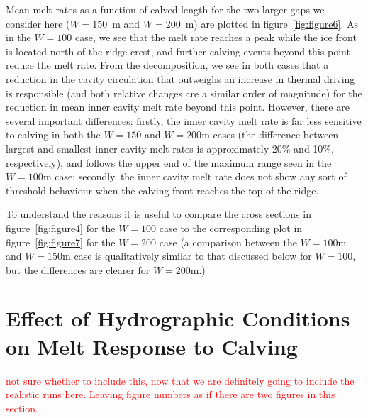 \documentclass[draft]{agujournal2019}
\newcommand{\red}[1]{\textcolor{red}{#1}}
\begin{document}
Mean melt rates as a function of calved length for the two larger gaps we consider here ($W = 150$~m and $W = 200$~m) are plotted in figure~\ref{fig:figure6}. As in the $W = 100$ case, we see that the melt rate reaches a peak while the ice front is located north of the ridge crest, and further calving events beyond this point reduce the melt rate. From the decomposition, we see in both cases that a reduction in the cavity circulation that outweighs an increase in thermal driving is responsible (and both relative changes are a similar order of magnitude) for the reduction in mean inner cavity melt rate beyond this point.  However, there are several important differences: firstly, the inner cavity melt rate is far less sensitive to calving in both the $W = 150$ and $W = 200$m cases (the difference between largest and smallest inner cavity melt rates is approximately 20\% and 10\%, respectively), and follows the upper end of the maximum range seen in the $W = 100$m case; secondly, the inner cavity melt rate does not show any sort of threshold behaviour when the calving front reaches the top of the ridge.

To understand the reasons it is useful to compare the cross sections in figure~\ref{fig:figure4} for the $W = 100$ case to the corresponding plot in figure~\ref{fig:figure7} for the $W = 200$ case (a comparison between the $W = 100$m and $W = 150$m case is qualitatively similar to that discussed below for $W = 100$, but the differences are clearer for $W = 200$m.)
%


\section{Effect of Hydrographic Conditions on Melt Response to Calving}\label{S:Results:P}
\red{not sure whether to include this, now that we are definitely going to include the realistic runs here. Leaving figure numbers as if there are two figures in this section.}
\end{document}
